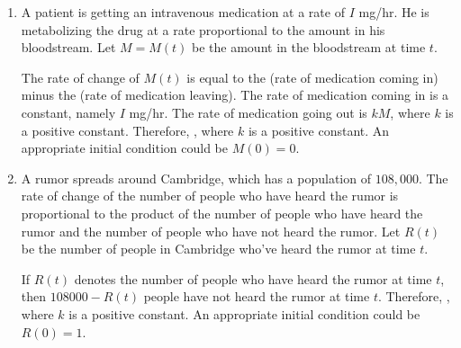 \documentclass[main]{subfiles}
\begin{document}
\begin{enumerate}
\begin{enumerate}
  \begin{solution}
    The rate of change of water volume in the bucket (over time) is
    $\frac{dW}{dt}$, which is equal to (rate of water coming in) minus
    (rate of water coming out).  The rate of water coming in is 7.5 liters
    per minute.  The
    rate of water going out is $k \sqrt{W(t)}$ where $k$ is a positive constant.
    So, . An appropriate initial condition could be $\boxed{W(0)=0}$.
  \end{solution}

\item  
  \begin{problem}[\vfill]
     A patient is getting an intravenous medication at a rate of $I$ mg/hr. He 
     is metabolizing the drug at a rate proportional to the amount in his 
     bloodstream. Let $M = M(t)$ be the amount in the bloodstream at time $t$.   
  \end{problem}


  \begin{solution}
    The rate of change of $M(t)$ is equal to the (rate of medication coming in)
    minus the (rate of medication leaving).  The rate of medication coming in
    is a constant, namely $I$ mg/hr.  The rate of medication going out is
    $k M$, where $k$ is a positive constant.  Therefore,
    , where $k$ is a positive constant. An appropriate initial condition could be $\boxed{M(0)=0}$.
  \end{solution}

\item  
  \begin{problem}[\vfill]
    A rumor spreads around Cambridge, which has a population of $108,000$.  The
    rate of change of the number of people who have heard the rumor is proportional
    to the product of the number of people who have heard the rumor and the number
    of people who have not heard the rumor. Let $R(t)$ be the number of people in Cambridge who've heard the rumor at time $t$.
  \end{problem}

  \begin{solution}
    If $R(t)$ denotes the number of people who have heard the rumor at time $t$, then
    $108000 - R(t)$ people have not heard the rumor at time $t$.  Therefore,
    , where $k$ is a positive constant. An appropriate initial condition could be $\boxed{R(0)=1}$.
  \end{solution}
\end{enumerate}


\end{enumerate}
\end{document}
